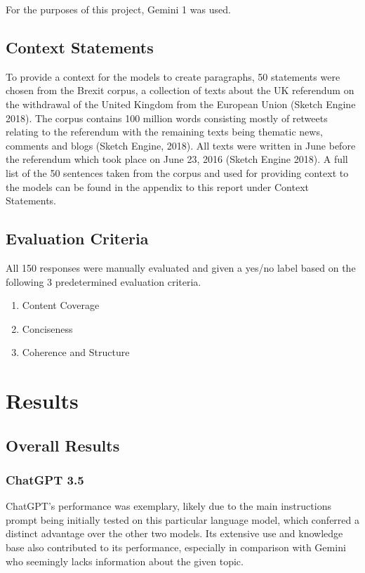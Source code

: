 \documentclass[fleqn,moreauthors,10pt]{ds_report}
\begin{document}
For the purposes of this project, Gemini 1 was used.

\subsection*{Context Statements}

To provide a context for the models to create paragraphs, 50 statements were chosen from the Brexit corpus, a collection of texts about the UK referendum on the withdrawal of the United Kingdom from the European Union (Sketch Engine 2018). The corpus contains 100 million words consisting mostly of retweets relating to the referendum with the remaining texts being thematic news, comments and blogs (Sketch Engine, 2018). All texts were written in June before the referendum which took place on June 23, 2016 (Sketch Engine 2018). A full list of the 50 sentences taken from the corpus and used for providing context to the models can be found in the appendix to this report under Context Statements.

\subsection*{Evaluation Criteria}

All 150 responses were manually evaluated and given a yes/no label based on the following 3 predetermined evaluation criteria.

\begin{enumerate}
    \item Content Coverage
    \item Conciseness
    \item Coherence and Structure
\end{enumerate}


\section*{Results}

\subsection*{Overall Results}

\subsubsection*{ChatGPT 3.5}
ChatGPT’s performance was exemplary, likely due to the main instructions prompt being initially tested on this particular language model, which conferred a distinct advantage over the other two models. Its extensive use and knowledge base also contributed to its performance, especially in comparison with Gemini who seemingly lacks information about the given topic.
\end{document}
